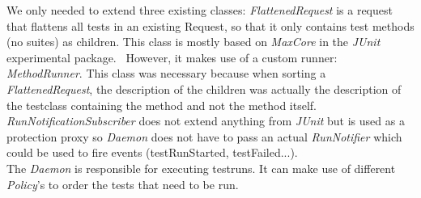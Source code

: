 \documentclass[i2]{oss}
\newcommand{\class}[1]{\emph{#1}}
\newcommand{\junit}{\emph{JUnit }}
\begin{document}
We only needed to extend three existing classes: \class{FlattenedRequest}
is a request that flattens all tests in an existing Request, so that it only contains test methods (no suites) as children. 
This class is mostly based on \class{MaxCore} in the \junit experimental package. \
However, it makes use of a custom runner: \class{MethodRunner}. 
This class was necessary because when sorting a \class{FlattenedRequest}, the description of the children was actually the
description of the testclass containing the method and not the method 
itself.\\

\class{RunNotificationSubscriber} does not extend anything from 
\junit but is used as a protection proxy so \class{Daemon} does not have 
to pass an actual \class{RunNotifier} which could be used to fire events 
(testRunStarted, testFailed...). \\

The \class{Daemon} is responsible for executing testruns.
It can make use of different \class{Policy}'s to order the tests that 
need to be run. \\
\end{document}
